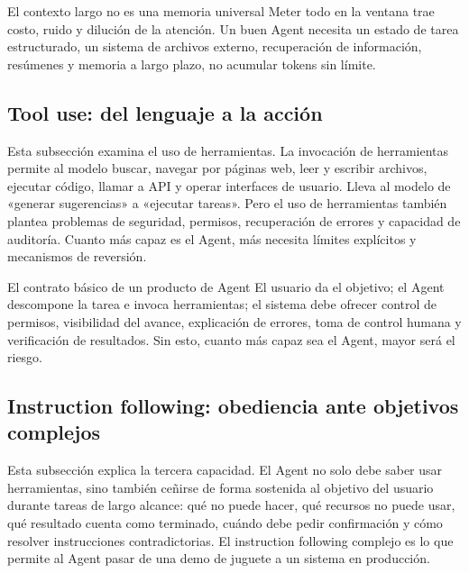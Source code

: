 \begin{warningbox}{El contexto largo no es una memoria universal}
Meter todo en la ventana trae costo, ruido y dilución de la atención. Un buen Agent necesita un estado de tarea estructurado, un sistema de archivos externo, recuperación de información, resúmenes y memoria a largo plazo, no acumular tokens sin límite.
\end{warningbox}

\subsection{Tool use: del lenguaje a la acción}

Esta subsección examina el uso de herramientas. La invocación de herramientas permite al modelo buscar, navegar por páginas web, leer y escribir archivos, ejecutar código, llamar a API y operar interfaces de usuario. Lleva al modelo de «generar sugerencias» a «ejecutar tareas». Pero el uso de herramientas también plantea problemas de seguridad, permisos, recuperación de errores y capacidad de auditoría. Cuanto más capaz es el Agent, más necesita límites explícitos y mecanismos de reversión.

\begin{importantbox}{El contrato básico de un producto de Agent}
El usuario da el objetivo; el Agent descompone la tarea e invoca herramientas; el sistema debe ofrecer control de permisos, visibilidad del avance, explicación de errores, toma de control humana y verificación de resultados. Sin esto, cuanto más capaz sea el Agent, mayor será el riesgo.
\end{importantbox}

\subsection{Instruction following: obediencia ante objetivos complejos}

Esta subsección explica la tercera capacidad. El Agent no solo debe saber usar herramientas, sino también ceñirse de forma sostenida al objetivo del usuario durante tareas de largo alcance: qué no puede hacer, qué recursos no puede usar, qué resultado cuenta como terminado, cuándo debe pedir confirmación y cómo resolver instrucciones contradictorias. El instruction following complejo es lo que permite al Agent pasar de una demo de juguete a un sistema en producción.

